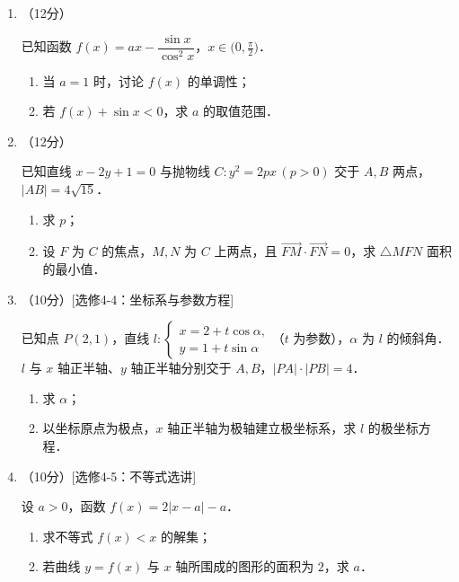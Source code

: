 \begin{description}
\begin{enumerate}[leftmargin=5pt]
        \begin{enumerate}[label=(\arabic*)]
            \item 计算对照组和试验组的平均体重，判断臭氧对小白鼠体重的影响；
            \item 根据数据，能否有 $95\%$ 的把握认为臭氧对小白鼠体重有影响？
        \end{enumerate}

        \item （12分）

        已知函数 $f(x)=ax-\dfrac{\sin x}{\cos^2 x}$，$x\in\bigl(0,\frac{\pi}{2}\bigr)$．

        \begin{enumerate}[label=(\arabic*)]
            \item 当 $a=1$ 时，讨论 $f(x)$ 的单调性；
            \item 若 $f(x)+\sin x<0$，求 $a$ 的取值范围．
        \end{enumerate}

        \item （12分）

        已知直线 $x-2y+1=0$ 与抛物线 $C:y^2=2px\,(p>0)$ 交于 $A,B$ 两点，$|AB|=4\sqrt{15}$．

        \begin{enumerate}[label=(\arabic*)]
            \item 求 $p$；
            \item 设 $F$ 为 $C$ 的焦点，$M,N$ 为 $C$ 上两点，且 $\overrightarrow{FM}\cdot\overrightarrow{FN}=0$，求 $\triangle MFN$ 面积的最小值．
        \end{enumerate}

        \item （10分）[选修4-4：坐标系与参数方程]

        已知点 $P(2,1)$，直线 $l:\begin{cases}x=2+t\cos\alpha,\\y=1+t\sin\alpha\end{cases}$（$t$ 为参数），$\alpha$ 为 $l$ 的倾斜角．$l$ 与 $x$ 轴正半轴、$y$ 轴正半轴分别交于 $A,B$，$|PA|\cdot|PB|=4$．

        \begin{enumerate}[label=(\arabic*)]
            \item 求 $\alpha$；
            \item 以坐标原点为极点，$x$ 轴正半轴为极轴建立极坐标系，求 $l$ 的极坐标方程．
        \end{enumerate}

        \item （10分）[选修4-5：不等式选讲]

        设 $a>0$，函数 $f(x)=2|x-a|-a$．

        \begin{enumerate}[label=(\arabic*)]
            \item 求不等式 $f(x)<x$ 的解集；
            \item 若曲线 $y=f(x)$ 与 $x$ 轴所围成的图形的面积为 $2$，求 $a$．
        \end{enumerate}
    \end{enumerate}
\end{description}
\clearpage


